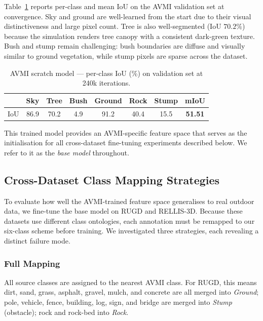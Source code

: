 Table~\ref{tab:scratch} reports per-class and mean IoU on the AVMI
validation set at convergence.  Sky and ground are well-learned from the
start due to their visual distinctiveness and large pixel count.  Tree is
also well-segmented (IoU $70.2\%$) because the simulation renders tree
canopy with a consistent dark-green texture.  Bush and stump remain
challenging: bush boundaries are diffuse and visually similar to ground
vegetation, while stump pixels are sparse across the dataset.

\begin{table}[h]
\centering
\caption{AVMI scratch model --- per-class IoU (\%) on validation set
         at 240k iterations.}
\label{tab:scratch}
\begin{tabular}{lcccccc|c}
\toprule
 & Sky & Tree & Bush & Ground & Rock & Stump & \textbf{mIoU} \\
\midrule
IoU & 86.9 & 70.2 & 4.9 & 91.2 & 40.4 & 15.5 & \textbf{51.51} \\
\bottomrule
\end{tabular}
\end{table}

This trained model provides an AVMI-specific feature space that serves as
the initialisation for all cross-dataset fine-tuning experiments described
below.  We refer to it as the \emph{base model} throughout.

\subsection{Cross-Dataset Class Mapping Strategies}
\label{sec:mapping}

To evaluate how well the AVMI-trained feature space generalises to real
outdoor data, we fine-tune the base model on RUGD and RELLIS-3D.
Because these datasets use different class ontologies, each annotation must
be remapped to our six-class scheme before training.  We investigated three
strategies, each revealing a distinct failure mode.

\subsubsection{Full Mapping}

All source classes are assigned to the nearest AVMI class.  For RUGD, this
means dirt, sand, grass, asphalt, gravel, mulch, and concrete are all
merged into \textit{Ground}; pole, vehicle, fence, building, log, sign, and
bridge are merged into \textit{Stump} (obstacle); rock and rock-bed into
\textit{Rock}.

